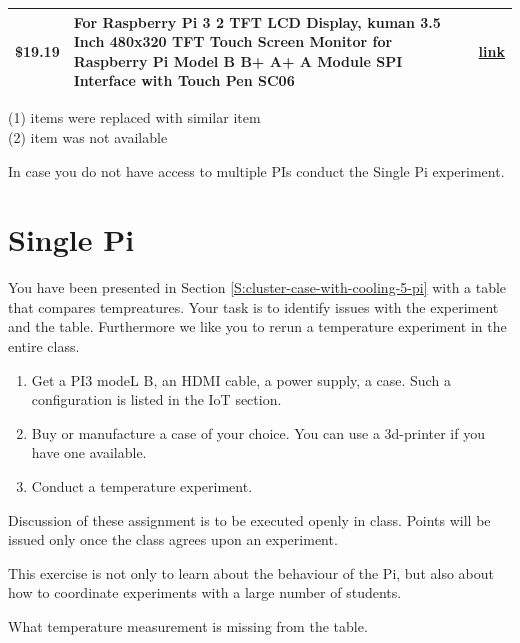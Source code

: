 \begin{table}[htb]
{\begin{tabular}{rp{13cm}p{1cm}}
\$19.19 & For Raspberry Pi 3 2 TFT LCD Display, kuman 3.5
   Inch 480x320 TFT Touch Screen Monitor for
   Raspberry Pi Model B B+ A+ A Module SPI
   Interface with Touch Pen SC06
     & 
\href{https://www.amazon.com/Raspberry-Display-kuman-480x320-Interface/dp/B01CNJVG8K/ref=sr\_1\_1?s=electronics\&ie=UTF8\&qid=1513783748\&sr=1-1\&keywords=pi+3+lcd+screen+3.5in}{link} \\
\hline
\end{tabular}
}
\smallskip

{\footnotesize (1) items were replaced with similar item}\\
{\footnotesize (2) item was not available}

\end{table}


\begin{exercise}
\label{E:cluster-pi}
In case you do not have access to multiple PIs conduct the Single Pi
experiment.
\end{exercise}

\section{Single Pi}


You have been presented in Section
\ref{S:cluster-case-with-cooling-5-pi} with a table that compares
tempreatures. Your task is to identify issues with the experiment and
the table.  Furthermore we like you to rerun a temperature experiment
in the entire class.


\begin{enumerate}
\item
  Get a PI3 modeL B, an HDMI cable, a power supply, a case. Such a
  configuration is listed in the IoT section. 
\item
  Buy or manufacture a case of your choice. You can use a 3d-printer
  if you have one available.
\item
  Conduct a temperature experiment.
\end{enumerate}

Discussion of these assignment is to be executed openly in
class. Points will be issued only once the class agrees upon an
experiment.

This exercise is not only to learn about the behaviour of the Pi, but
also about how to coordinate experiments with a large number of
students.


\begin{exercise}\label{E:Exercise.Pi.Single.1} 
What temperature measurement is
  missing from the table.
\end{exercise}

